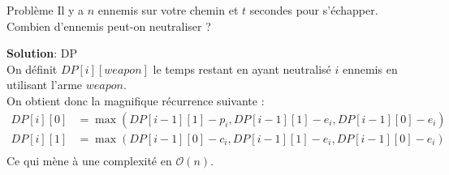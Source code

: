 \begin{frame}
    \frametitle{\problemtitle}
        \begin{block}
            {Problème} Il y a $n$ ennemis sur votre chemin et $t$ secondes pour s'échapper. Combien d'ennemis peut-on neutraliser ?
        \end{block}
        \pause
        \textbf{Solution}: DP \\
        \pause
        On définit $DP[i][weapon]$ le temps restant en ayant neutralisé $i$ ennemis en utilisant l'arme $weapon$.\\
        \pause
        On obtient donc la magnifique récurrence suivante :\\
        \begin{align*}
            DP[i][0] &= \max(DP[i-1][1] - p_i, DP[i-1][1] - e_i, DP[i-1][0] - e_i)\\
            DP[i][1] &= \max(DP[i-1][0] - c_i, DP[i-1][1] - e_i, DP[i-1][0] - e_i)\\
        \end{align*}
        Ce qui mène à une complexité en $\mathcal O(n)$.
\end{frame}

